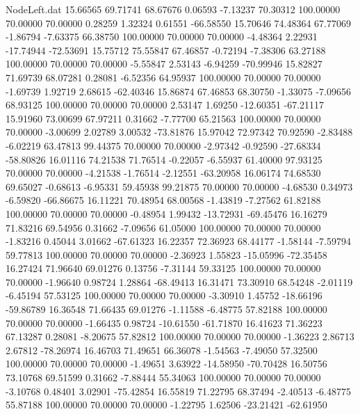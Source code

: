 \begin{filecontents}{NodeLeft.dat}
  15.66565   69.71741   68.67676     0.06593   -7.13237   70.30312  100.00000   70.00000   70.00000    0.28259    1.32324    0.61551  -66.58550
  15.70646   74.48364   67.77069    -1.86794   -7.63375   66.38750  100.00000   70.00000   70.00000   -4.48364    2.22931  -17.74944  -72.53691
  15.75712   75.55847   67.46857    -0.72194   -7.38306   63.27188  100.00000   70.00000   70.00000   -5.55847    2.53143   -6.94259  -70.99946
  15.82827   71.69739   68.07281     0.28081   -6.52356   64.95937  100.00000   70.00000   70.00000   -1.69739    1.92719    2.68615  -62.40346
  15.86874   67.46853   68.30750    -1.33075   -7.09656   68.93125  100.00000   70.00000   70.00000    2.53147    1.69250  -12.60351  -67.21117
  15.91960   73.00699   67.97211     0.31662   -7.77700   65.21563  100.00000   70.00000   70.00000   -3.00699    2.02789    3.00532  -73.81876
  15.97042   72.97342   70.92590    -2.83488   -6.02219   63.47813   99.44375   70.00000   70.00000   -2.97342   -0.92590  -27.68334  -58.80826
  16.01116   74.21538   71.76514    -0.22057   -6.55937   61.40000   97.93125   70.00000   70.00000   -4.21538   -1.76514   -2.12551  -63.20958
  16.06174   74.68530   69.65027    -0.68613   -6.95331   59.45938   99.21875   70.00000   70.00000   -4.68530    0.34973   -6.59820  -66.86675
  16.11221   70.48954   68.00568    -1.43819   -7.27562   61.82188  100.00000   70.00000   70.00000   -0.48954    1.99432  -13.72931  -69.45476
  16.16279   71.83216   69.54956     0.31662   -7.09656   61.05000  100.00000   70.00000   70.00000   -1.83216    0.45044    3.01662  -67.61323
  16.22357   72.36923   68.44177    -1.58144   -7.59794   59.77813  100.00000   70.00000   70.00000   -2.36923    1.55823  -15.05996  -72.35458
  16.27424   71.96640   69.01276     0.13756   -7.31144   59.33125  100.00000   70.00000   70.00000   -1.96640    0.98724    1.28864  -68.49413
  16.31471   73.30910   68.54248    -2.01119   -6.45194   57.53125  100.00000   70.00000   70.00000   -3.30910    1.45752  -18.66196  -59.86789
  16.36548   71.66435   69.01276    -1.11588   -6.48775   57.82188  100.00000   70.00000   70.00000   -1.66435    0.98724  -10.61550  -61.71870
  16.41623   71.36223   67.13287     0.28081   -8.20675   57.82812  100.00000   70.00000   70.00000   -1.36223    2.86713    2.67812  -78.26974
  16.46703   71.49651   66.36078    -1.54563   -7.49050   57.32500  100.00000   70.00000   70.00000   -1.49651    3.63922  -14.58950  -70.70428
  16.50756   73.10768   69.51599     0.31662   -7.88444   55.34063  100.00000   70.00000   70.00000   -3.10768    0.48401    3.02901  -75.42854
  16.55819   71.22795   68.37494    -2.40513   -6.48775   55.87188  100.00000   70.00000   70.00000   -1.22795    1.62506  -23.21421  -62.61950

\end{filecontents}
